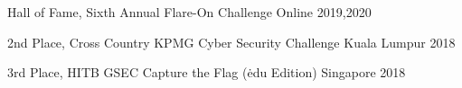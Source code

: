 



\begin{cvhonors}

  \cvhonor
    {Hall of Fame,} 
    {Sixth Annual Flare-On Challenge} 
    {Online} 
    {2019,2020}

  \cvhonor
    {2nd Place,} 
    {Cross Country KPMG Cyber Security Challenge} 
    {Kuala Lumpur} 
    {2018}

  \cvhonor
    {3rd Place,} 
    {HITB GSEC Capture the Flag (\.edu Edition)} 
    {Singapore} 
    {2018} 

\end{cvhonors}




